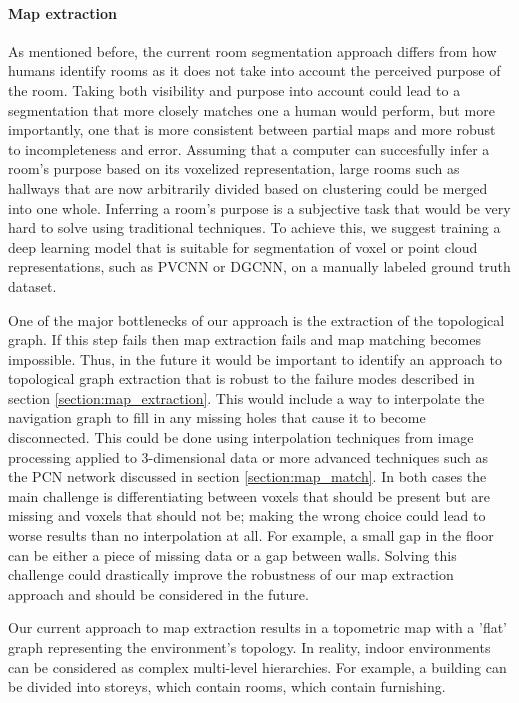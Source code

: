 \paragraph{Map extraction}

As mentioned before, the current room segmentation approach differs from how humans identify rooms as it does not take into account the perceived purpose of the room. Taking both visibility and purpose into account could lead to a segmentation that more closely matches one a human would perform, but more importantly, one that is more consistent between partial maps and more robust to incompleteness and error. Assuming that a computer can succesfully infer a room's purpose based on its voxelized representation, large rooms such as hallways that are now arbitrarily divided based on clustering could be merged into one whole. Inferring a room's purpose is a subjective task that would be very hard to solve using traditional techniques. To achieve this, we suggest training a deep learning model that is suitable for segmentation of voxel or point cloud representations, such as PVCNN or DGCNN, on a manually labeled ground truth dataset. 

One of the major bottlenecks of our approach is the extraction of the topological graph. If this step fails then map extraction fails and map matching becomes impossible. Thus, in the future it would be important to identify an approach to topological graph extraction that is robust to the failure modes described in section \ref{section:map_extraction}. This would include a way to interpolate the navigation graph to fill in any missing holes that cause it to become disconnected. This could be done using interpolation techniques from image processing applied to 3-dimensional data or more advanced techniques such as the PCN network discussed in section \ref{section:map_match}. In both cases the main challenge is differentiating between voxels that should be present but are missing and voxels that should not be; making the wrong choice could lead to worse results than no interpolation at all. For example, a small gap in the floor can be either a piece of missing data or a gap between walls. Solving this challenge could drastically improve the robustness of our map extraction approach and should be considered in the future.

Our current approach to map extraction results in a topometric map with a 'flat' graph representing the environment's topology. In reality, indoor environments can be considered as complex multi-level hierarchies. For example, a building can be divided into storeys, which contain rooms, which contain furnishing. 

